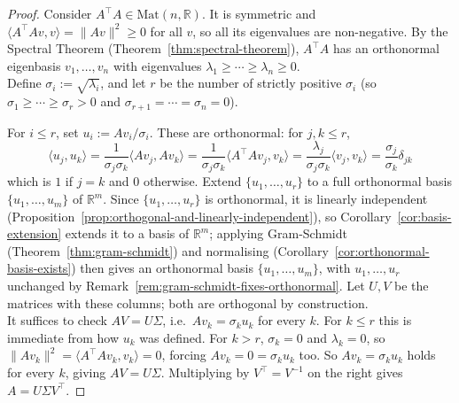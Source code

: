 	\begin{proof}
		Consider $A^\top A \in \mathrm{Mat}(n,\mathbb{R})$. It is symmetric and $\langle A^\top A v, v\rangle = \|Av\|^2 \ge 0$ for all $v$, so all its eigenvalues are non-negative. By the Spectral Theorem (Theorem~\ref{thm:spectral-theorem}), $A^\top A$ has an orthonormal eigenbasis $v_1,\dots,v_n$ with eigenvalues $\lambda_1 \ge \cdots \ge \lambda_n \ge 0$. \\
		
		Define $\sigma_i := \sqrt{\lambda_i}$, and let $r$ be the number of strictly positive $\sigma_i$ (so $\sigma_1\ge\cdots\ge\sigma_r>0$ and $\sigma_{r+1}=\cdots=\sigma_n=0$).
		
		For $i \le r$, set $u_i := Av_i/\sigma_i$. These are orthonormal: for $j,k\le r$,
		\[
			\langle u_j,u_k\rangle = \frac{1}{\sigma_j\sigma_k}\langle Av_j,Av_k\rangle = \frac{1}{\sigma_j\sigma_k}\langle A^\top Av_j,v_k\rangle = \frac{\lambda_j}{\sigma_j\sigma_k}\langle v_j,v_k\rangle = \frac{\sigma_j}{\sigma_k}\delta_{jk}
		\]
		which is $1$ if $j=k$ and $0$ otherwise. Extend $\{u_1,\dots,u_r\}$ to a full orthonormal basis $\{u_1,\dots,u_m\}$ of $\mathbb{R}^m$. Since $\{u_1,\dots,u_r\}$ is orthonormal, it is linearly independent (Proposition~\ref{prop:orthogonal-and-linearly-independent}), so Corollary~\ref{cor:basis-extension} extends it to a basis of $\mathbb{R}^m$; applying Gram-Schmidt (Theorem~\ref{thm:gram-schmidt}) and normalising (Corollary~\ref{cor:orthonormal-basis-exists}) then gives an orthonormal basis $\{u_1,\dots,u_m\}$, with $u_1,\dots,u_r$ unchanged by Remark~\ref{rem:gram-schmidt-fixes-orthonormal}. Let $U,V$ be the matrices with these columns; both are orthogonal by construction. \\
		
		It suffices to check $AV=U\Sigma$, i.e.\ $Av_k = \sigma_k u_k$ for every $k$. For $k\le r$ this is immediate from how $u_k$ was defined. For $k>r$, $\sigma_k=0$ and $\lambda_k=0$, so $\|Av_k\|^2 = \langle A^\top Av_k,v_k\rangle = 0$, forcing $Av_k=0=\sigma_k u_k$ too. So $Av_k=\sigma_k u_k$ holds for every $k$, giving $AV=U\Sigma$. Multiplying by $V^\top=V^{-1}$ on the right gives $A=U\Sigma V^\top$.
	\end{proof}
	
